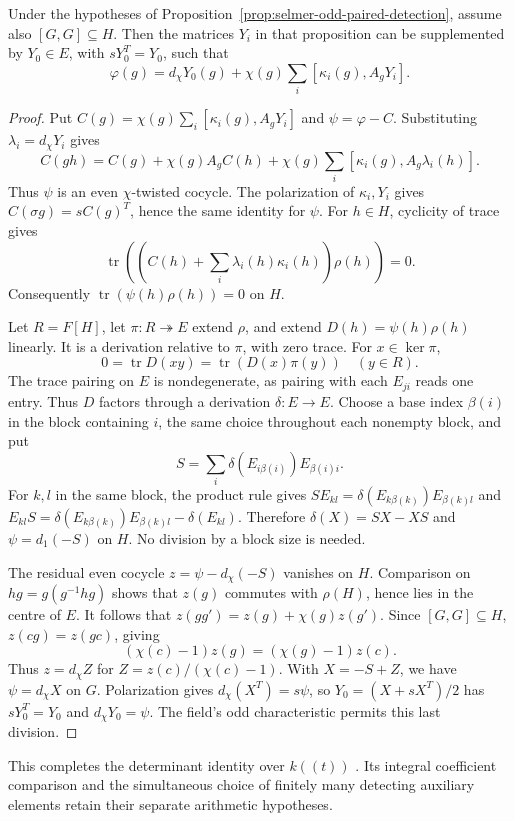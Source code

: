 \begin{corollary}
\label{cor:selmer-paired-detection}
Under the hypotheses of Proposition~\ref{prop:selmer-odd-paired-detection},
assume also $[G,G]\subseteq H$. Then the matrices $Y_i$ in that
proposition can be supplemented by $Y_0\in E$, with $sY_0^T=Y_0$,
such that
\[
 \varphi(g)=d_\chi Y_0(g)
          +\chi(g)\sum_i[\kappa_i(g),A_gY_i].
\]
\end{corollary}

\begin{proof}
Put $C(g)=\chi(g)\sum_i[\kappa_i(g),A_gY_i]$ and
$\psi=\varphi-C$. Substituting $\lambda_i=d_\chi Y_i$ gives
\[
 C(gh)=C(g)+\chi(g)A_gC(h)
             +\chi(g)\sum_i[\kappa_i(g),A_g\lambda_i(h)].
\]
Thus $\psi$ is an even $\chi$-twisted cocycle. The polarization
of $\kappa_i,Y_i$ gives $C(\sigma g)=sC(g)^T$, hence the same
identity for $\psi$. For $h\in H$, cyclicity of trace gives
\[
 \operatorname{tr}\left(\left(C(h)+\sum_i\lambda_i(h)
                   \kappa_i(h)\right)\rho(h)\right)=0.
\]
Consequently $\operatorname{tr}(\psi(h)\rho(h))=0$ on $H$.

Let $R=F[H]$, let $\pi:R\twoheadrightarrow E$ extend $\rho$,
and extend $D(h)=\psi(h)\rho(h)$ linearly. It is a derivation
relative to $\pi$, with zero trace. For $x\in\ker\pi$,
\[
                 0=\operatorname{tr}D(xy)
                    =\operatorname{tr}(D(x)\pi(y))\quad(y\in R).
\]
The trace pairing on $E$ is nondegenerate, as pairing with each
$E_{ji}$ reads one entry. Thus $D$ factors through a derivation
$\delta:E\to E$. Choose a base index $\beta(i)$ in the block
containing $i$, the same choice throughout each nonempty block, and put
\[
                     S=\sum_i\delta(E_{i\beta(i)})E_{\beta(i)i}.
\]
For $k,l$ in the same block, the product rule gives
$SE_{kl}=\delta(E_{k\beta(k)})E_{\beta(k)l}$ and
$E_{kl}S=\delta(E_{k\beta(k)})E_{\beta(k)l}-\delta(E_{kl})$.
Therefore $\delta(X)=SX-XS$ and $\psi=d_1(-S)$ on $H$.
No division by a block size is needed.

The residual even cocycle $z=\psi-d_\chi(-S)$ vanishes on $H$.
Comparison on $hg=g(g^{-1}hg)$ shows that $z(g)$ commutes with
$\rho(H)$, hence lies in the centre of $E$. It follows that
$z(gg')=z(g)+\chi(g)z(g')$. Since $[G,G]\subseteq H$,
$z(cg)=z(gc)$, giving
\[
            (\chi(c)-1)z(g)=(\chi(g)-1)z(c).
\]
Thus $z=d_\chi Z$ for $Z=z(c)/(\chi(c)-1)$. With $X=-S+Z$,
we have $\psi=d_\chi X$ on $G$. Polarization gives
$d_\chi(X^T)=s\psi$, so
$Y_0=(X+sX^T)/2$ has $sY_0^T=Y_0$ and $d_\chi Y_0=\psi$.
The field's odd characteristic permits this last division.
\end{proof}

This completes the determinant identity over $k((t))$
\cite{alpo-even-detection}. Its integral coefficient comparison and
the simultaneous choice of finitely many detecting auxiliary elements
retain their separate arithmetic hypotheses.
